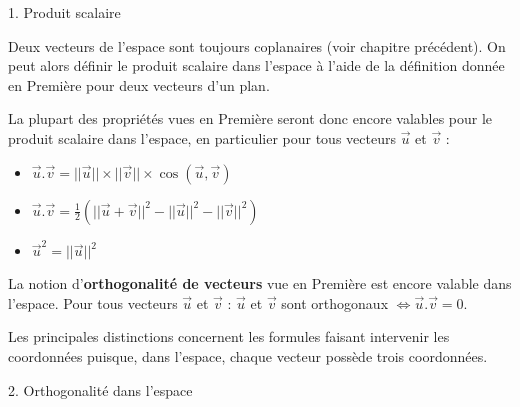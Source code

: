 
\begin{h2}1. Produit scalaire\end{h2}
Deux vecteurs de l'espace sont toujours coplanaires (voir chapitre précédent). On peut alors définir le produit scalaire dans l'espace à l'aide de la définition donnée en Première pour deux vecteurs d'un plan.
\par
La plupart des propriétés vues en Première seront donc encore valables pour le produit scalaire dans l'espace, en particulier pour tous vecteurs $\vec{u}$ et $\vec{v}$ :
\begin{itemize}
     \item $\vec{u}.\vec{v}=||\vec{u}||\times ||\vec{v}||\times  \cos\left(\vec{u}, \vec{v}\right)$
     \item $\vec{u}.\vec{v}=\frac{1}{2} \left(||\vec{u}+\vec{v}||^{2}-||\vec{u}||^{2}-||\vec{v}||^{2}\right)$
     \item $\vec{u}^{2} = ||\vec{u}||^{2}$
\end{itemize}
La notion d'\textbf{orthogonalité de vecteurs} vue en Première est encore valable dans l'espace. Pour tous vecteurs $\vec{u}$ et $\vec{v}$ : $\vec{u}$ et $\vec{v}$ sont orthogonaux  $ \Leftrightarrow   \vec{u}.\vec{v}=0$.
\par
Les principales distinctions concernent les formules faisant intervenir les coordonnées puisque, dans l'espace, chaque vecteur possède trois coordonnées.
\begin{h2}2. Orthogonalité dans l'espace\end{h2}
